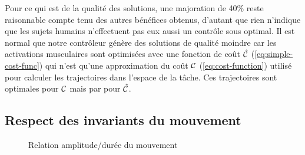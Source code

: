 \documentclass[pdftex,a4paper,11pt]{article}
\newenvironment{changemargin}[2]{\begin{list}{}{%
    \setlength{\topsep}{0pt}%
    \setlength{\leftmargin}{0pt}%
    \setlength{\rightmargin}{0pt}%
    \setlength{\listparindent}{\parindent}%
    \setlength{\itemindent}{\parindent}%
    \setlength{\parsep}{0pt plus 1pt}%
    \addtolength{\leftmargin}{#1}%
    \addtolength{\rightmargin}{#2}%
}\item }{\end{list}}
\begin{document}
Pour ce qui est de la qualité des solutions, une majoration de 40\% reste
raisonnable compte tenu des autres bénéfices obtenus, d'autant que rien
n'indique que les sujets humains n'effectuent pas eux aussi un contrôle sous
optimal.
Il est normal que notre contrôleur génère des solutions de qualité moindre car les
activations musculaires sont optimisées avec une fonction de coût
$\hat{\mathcal{C}}$ (\ref{eq:simple-cost-func}) qui n'est qu'une approximation du
coût $\mathcal{C}$ (\ref{eq:cost-function}) utilisé pour calculer les
trajectoires dans l'espace de la tâche. Ces trajectoires sont optimales
pour $\mathcal{C}$ mais par pour $\hat{\mathcal{C}}$.


\subsection{Respect des invariants du mouvement}

\begin{figure}[p]
    \begin{changemargin}{-3.5cm}{-3.5cm}
      \centering
      \caption{Relation amplitude/durée du mouvement}
      \label{fig:scaling}
    \end{changemargin}
\end{figure}
\end{document}

